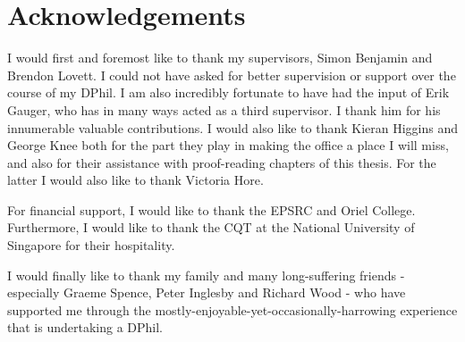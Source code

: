 
\chapter*{Acknowledgements} 

I would first and foremost like to thank my supervisors, Simon Benjamin and Brendon Lovett. I could not have asked for better supervision or support over the course of my DPhil. I am also incredibly fortunate to have had the input of Erik Gauger, who has in many ways acted as a third supervisor. I thank him for his innumerable valuable contributions. I would also like to thank Kieran Higgins and George Knee both for the part they play in making the office a place I will miss, and also for their assistance with proof-reading chapters of this thesis. For the latter I would also like to thank Victoria Hore.

For financial support, I would like to thank the EPSRC and Oriel College. Furthermore, I would like to thank the CQT at the National University of Singapore for their hospitality.

I would finally like to thank my family and many long-suffering friends - especially Graeme Spence, Peter Inglesby and Richard Wood - who have supported me through the mostly-enjoyable-yet-occasionally-harrowing experience that is undertaking a DPhil.
